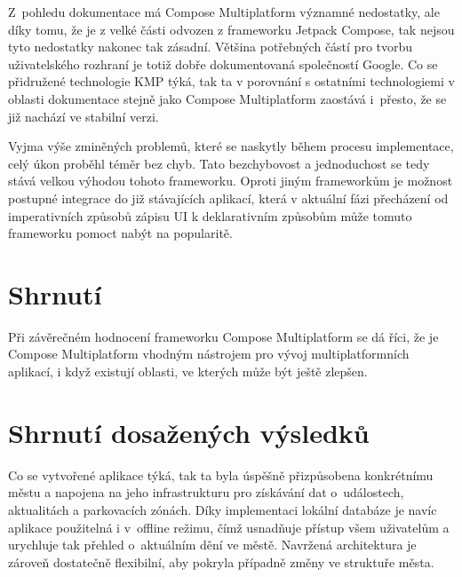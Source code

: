 
Z~pohledu dokumentace má Compose Multiplatform významné nedostatky, ale díky tomu, že je z velké části odvozen z frameworku Jetpack Compose,
tak nejsou tyto nedostatky nakonec tak zásadní. Většina potřebných částí pro tvorbu uživatelského rozhraní je totiž dobře dokumentovaná 
společností Google. Co se přidružené technologie KMP týká, tak ta v porovnání s ostatními technologiemi v oblasti dokumentace stejně jako Compose 
Multiplatform zaostává i~přesto, že se již nachází ve stabilní verzi.


Vyjma výše zminěných problemů, které se naskytly během procesu implementace, celý úkon proběhl téměr bez chyb. Tato bezchybovost a 
jednoduchost se tedy stává velkou výhodou tohoto frameworku. Oproti jiným frameworkům je možnost postupné integrace do již stávajících 
aplikací, která v aktuální fázi přecházení od imperativních způsobů zápisu UI k deklarativním způsobům může tomuto frameworku pomoct 
nabýt na popularitě. 


\section*{Shrnutí}
Při závěrečném hodnocení frameworku Compose Multiplatform se dá říci, že je Compose Multiplatform vhodným nástrojem pro vývoj multiplatformních aplikací, i když existují oblasti, ve kterých může být ještě zlepšen.


\section{Shrnutí dosažených výsledků}
Co se vytvořené aplikace týká, tak ta byla úspěšně přizpůsobena konkrétnímu městu a napojena na jeho infrastrukturu pro získávání dat 
o~událostech, aktualitách a parkovacích zónách. Díky implementaci lokální databáze je navíc aplikace použitelná i v~offline režimu, čímž 
usnadňuje přístup všem uživatelům a urychluje tak přehled o~aktuálním dění ve městě. Navržená architektura je zároveň dostatečně flexibilní, 
aby pokryla případně změny ve struktuře města.

